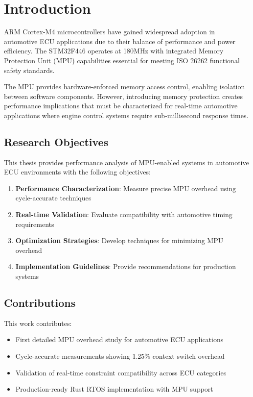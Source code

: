 \chapter{Introduction}
\label{sec:introduction}

ARM Cortex-M4 microcontrollers have gained widespread adoption in automotive ECU applications due to their balance of performance and power efficiency. The STM32F446 operates at 180MHz with integrated Memory Protection Unit (MPU) capabilities essential for meeting ISO 26262 functional safety standards.

The MPU provides hardware-enforced memory access control, enabling isolation between software components. However, introducing memory protection creates performance implications that must be characterized for real-time automotive applications where engine control systems require sub-millisecond response times.

\section{Research Objectives}

This thesis provides performance analysis of MPU-enabled systems in automotive ECU environments with the following objectives:

\begin{enumerate}
    \item \textbf{Performance Characterization}: Measure precise MPU overhead using cycle-accurate techniques
    \item \textbf{Real-time Validation}: Evaluate compatibility with automotive timing requirements
    \item \textbf{Optimization Strategies}: Develop techniques for minimizing MPU overhead
    \item \textbf{Implementation Guidelines}: Provide recommendations for production systems
\end{enumerate}

\section{Contributions}

This work contributes:
\begin{itemize}
    \item First detailed MPU overhead study for automotive ECU applications
    \item Cycle-accurate measurements showing 1.25\% context switch overhead
    \item Validation of real-time constraint compatibility across ECU categories
    \item Production-ready Rust RTOS implementation with MPU support
\end{itemize}